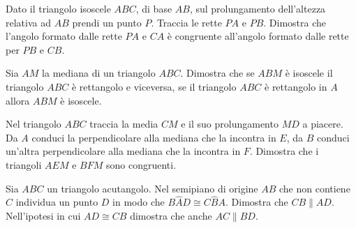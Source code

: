 \begin{multicols}{2}
\begin{esercizio}
\label{ese:3.70}
Dato il triangolo isoscele $ABC$, di base $AB$, sul prolungamento 
dell'altezza relativa ad $AB$ prendi un punto $P$. Traccia le rette 
$PA$ e $PB$. Dimostra che l'angolo formato dalle rette $PA$ e $CA$ è 
congruente all'angolo formato dalle rette per $PB$ e $CB$.
\end{esercizio}

\begin{esercizio}
\label{ese:3.74}
Sia $AM$ la mediana di un triangolo $ABC$. Dimostra che se $ABM$ è 
isoscele il triangolo $ABC$ è rettangolo e viceversa, se il triangolo 
$ABC$ è rettangolo in $A$ allora $ABM$ è isoscele.
\end{esercizio}

\begin{esercizio}
\label{ese:3.78}
Nel triangolo $ABC$ traccia la media $CM$ e il suo prolungamento $MD$ 
a piacere. Da $A$ conduci la perpendicolare alla mediana che la 
incontra in $E$, da $B$ conduci un'altra perpendicolare alla mediana 
che la incontra in $F$. Dimostra che i triangoli $AEM$ e $BFM$ sono 
congruenti.
\end{esercizio}

\begin{esercizio}
\label{ese:3.81}
Sia $ABC$ un triangolo acutangolo. Nel semipiano di origine $AB$ che 
non contiene $C$ individua un punto $D$ in modo che 
$B\widehat{A}D\cong C\widehat{B}A$. Dimostra che $CB\parallel AD$. 
Nell'ipotesi in cui $AD\cong CB$ dimostra che anche $AC\parallel BD$.
\end{esercizio}

\end{multicols}


\subsubsection*{}

